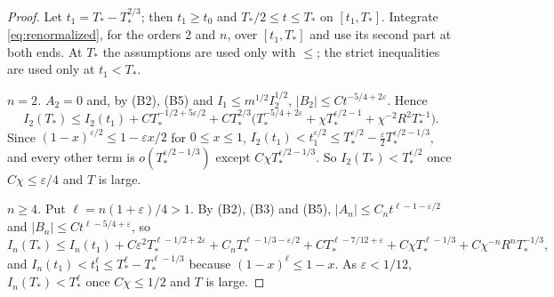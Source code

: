 \documentclass[11pt]{article}
\theoremstyle{definition}
\begin{document}
\begin{proof}
Let $t_1 = T_* - T_*^{2/3}$; then $t_1 \ge t_0$ and $T_*/2 \le t \le T_*$ on $[t_1, T_*]$. Integrate \eqref{eq:renormalized}, for the orders $2$ and $n$, over $[t_1, T_*]$ and use its second part at both ends. At $T_*$ the assumptions are used only with $\le$; the strict inequalities are used only at $t_1 < T_*$.

\emph{$n = 2$.} $A_2 = 0$ and, by (B2), (B5) and $I_1 \le m^{1/2}I_2^{1/2}$, $|B_2| \le Ct^{-5/4+2\varepsilon}$. Hence
\[
  I_2(T_*) \le I_2(t_1) + CT_*^{-1/2+5\varepsilon/2} + CT_*^{2/3}\bigl(T_*^{-5/4+2\varepsilon} + \chi T_*^{\varepsilon/2-1} + \chi^{-2}R^2T_*^{-1}\bigr).
\]
Since $(1 - x)^{\varepsilon/2} \le 1 - \varepsilon x/2$ for $0 \le x \le 1$, $I_2(t_1) < t_1^{\varepsilon/2} \le T_*^{\varepsilon/2} - \frac\varepsilon2T_*^{\varepsilon/2-1/3}$, and every other term is $o(T_*^{\varepsilon/2-1/3})$ except $C\chi T_*^{\varepsilon/2-1/3}$. So $I_2(T_*) < T_*^{\varepsilon/2}$ once $C\chi \le \varepsilon/4$ and $T$ is large.

\emph{$n \ge 4$.} Put $\ell = n(1+\varepsilon)/4 > 1$. By (B2), (B3) and (B5), $|A_n| \le C_nt^{\ell - 1 - \varepsilon/2}$ and $|B_n| \le Ct^{\ell - 5/4 + \varepsilon}$, so
\[
  I_n(T_*) \le I_n(t_1) + C\varepsilon^2T_*^{\ell - 1/2 + 2\varepsilon} + C_nT_*^{\ell - 1/3 - \varepsilon/2} + CT_*^{\ell - 7/12 + \varepsilon} + C\chi T_*^{\ell - 1/3} + C\chi^{-n}R^nT_*^{-1/3},
\]
and $I_n(t_1) < t_1^\ell \le T_*^\ell - T_*^{\ell - 1/3}$ because $(1 - x)^\ell \le 1 - x$. As $\varepsilon < 1/12$, $I_n(T_*) < T_*^\ell$ once $C\chi \le 1/2$ and $T$ is large.


\end{proof}
\end{document}
